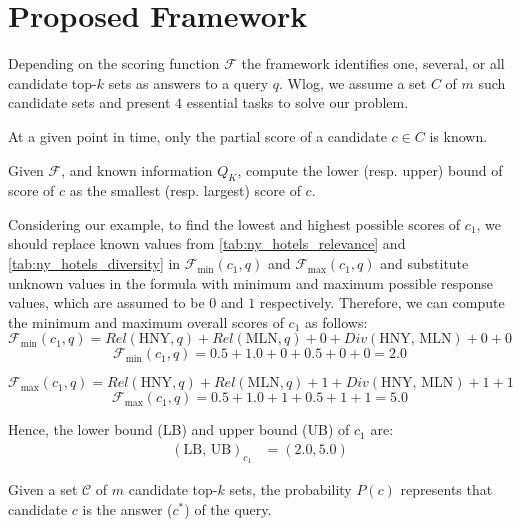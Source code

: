 \section{Proposed Framework}\label{sec:framework}
Depending on the scoring function $\mathcal{F}$ the framework identifies one, several, or all candidate top-$k$ sets as answers to a query $q$. Wlog, we assume a set $C$ of $m$ such candidate sets and present $4$ essential tasks to solve our problem.

At a given point in time, only the partial score of a candidate $c \in C$ is known. 

Given $\mathcal{F}$, and known information $Q_K$, compute the lower (resp. upper) bound of score of $c$ as the smallest (resp. largest) score of $c$.

Considering our example, to find the lowest and highest possible scores of $c_1$, we should replace known values from \autoref{tab:ny_hotels_relevance} and \autoref{tab:ny_hotels_diversity} in $\mathcal{F}_{\text{min}}(c_1, q)$ and $\mathcal{F}_{\text{max}}(c_1, q)$ and substitute unknown values in the formula with minimum and maximum possible response values, which are assumed to be $0$ and $1$ respectively. Therefore, we can compute the minimum and maximum overall scores of $c_1$ as follows:
\[
\mathcal{F}_{\text{min}}(c_1, q) = Rel(\text{HNY},q) + Rel(\text{MLN},q) + 0 + Div(\text{HNY, MLN}) + 0 + 0
\]
\[
\mathcal{F}_{\text{min}}(c_1, q) = 0.5 + 1.0 + 0 + 0.5 + 0 + 0 = 2.0
\]

\[
\mathcal{F}_{\text{max}}(c_1, q) = Rel(\text{HNY},q) + Rel(\text{MLN},q) + 1 + Div(\text{HNY, MLN}) + 1 + 1
\]
\[
\mathcal{F}_{\text{max}}(c_1, q) = 0.5 + 1.0 + 1 + 0.5 + 1 + 1 = 5.0
\]

Hence, the lower bound (LB) and upper bound (UB) of \( c_1 \) are:
\begin{align*}
    (\text{LB, UB})_{c_1} &= (2.0, 5.0)
\end{align*}
    
 Given a set $\mathcal{C}$ of $m$ candidate top-$k$ sets, the probability $P(c)$ represents that candidate $c$ is the answer ($c^*$) of the query.
 
